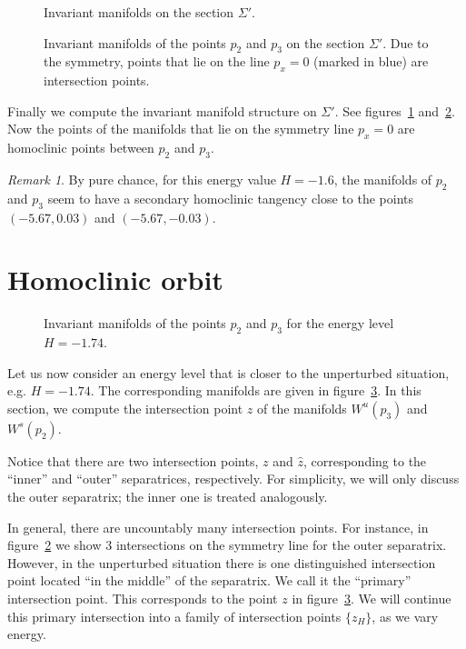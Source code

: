 \documentclass[a4paper]{amsart}
\theoremstyle{remark}
\newtheorem{rem}[thm]{Remark}
\begin{document}
\begin{figure}
\caption{Invariant manifolds on the section $\Sigma'$.}
\label{fig:invmfld2}
\end{figure}

\begin{figure}
\caption{Invariant manifolds of the points $p_2$ and $p_3$ on the
section $\Sigma'$. Due to the symmetry, points that lie on the line
$p_x=0$ (marked in blue) are intersection points.}
\label{fig:invmfld2_it23}
\end{figure}

Finally we compute the invariant manifold structure on $\Sigma'$. See
figures~\ref{fig:invmfld2} and~\ref{fig:invmfld2_it23}.
Now the points of the manifolds that lie on the symmetry line $p_x=0$
are homoclinic points between $p_2$ and $p_3$.

\begin{rem}
By pure chance, for this energy value $H=-1.6$, the manifolds of $p_2$
and $p_3$ seem to have a secondary homoclinic tangency close to the
points $(-5.67,0.03)$ and $(-5.67,-0.03)$.
\end{rem}

\section{Homoclinic orbit}\label{sec:homoclinic_orbit}

\begin{figure}
\caption{Invariant manifolds of the points $p_2$ and $p_3$ for the
energy level $H=-1.74$.}
\label{fig:invmfld2_it23_H174}
\end{figure}

Let us now consider an energy level that is closer to the unperturbed
situation, e.g. $H=-1.74$. The corresponding manifolds are given in
figure~\ref{fig:invmfld2_it23_H174}.
In this section, we compute the intersection point $z$ of the
manifolds $W^u(p_3)$ and $W^s(p_2)$.

Notice that there are two intersection points, $z$ and $\hat z$,
corresponding to the ``inner'' and ``outer'' separatrices,
respectively.
For simplicity, we will only discuss the outer separatrix; the inner
one is treated analogously.

In general, there are uncountably many intersection points. 
For instance, in figure~\ref{fig:invmfld2_it23} we show $3$
intersections on the symmetry line for the outer separatrix.
However, in the unperturbed situation there is one distinguished 
intersection point located ``in the middle'' of the separatrix. 
We call it the ``primary'' intersection point.
This corresponds to the point $z$ in figure~\ref{fig:invmfld2_it23_H174}.
We will continue this primary intersection into a family of
intersection points $\{z_H\}$, as we vary energy.
\end{document}
